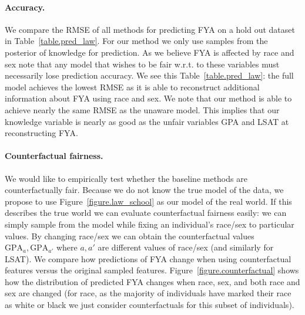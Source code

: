 \paragraph{Accuracy.}
We compare the RMSE of all methods for predicting FYA on a hold out dataset in Table~\ref{table.pred_law}. For our method we only use samples from the posterior of knowledge for prediction. As we believe FYA is affected by race and sex note that any model that wishes to be fair w.r.t. to these variables must necessarily lose prediction accuracy. We see this Table~\ref{table.pred_law}: the full model achieves the lowest RMSE as it is able to reconstruct additional information about FYA using race and sex. We note that our method is able to achieve nearly the same RMSE as the unaware model. This implies that our knowledge variable is nearly as good as the unfair variables GPA and LSAT at reconstructing FYA.


\paragraph{Counterfactual fairness.}
We would like to empirically test whether the baseline methods are counterfactually fair. Because we do not know the true model of the data, we propose to use Figure~\ref{figure.law_school} as our model of the real world. If this describes the true world we can evaluate counterfactual fairness easily: we can simply sample from the model while fixing an individual's race/sex to particular values. By changing race/sex we can obtain the counterfactual values $\mbox{GPA}_a,\mbox{GPA}_{a'}$ where $a,a'$ are different values of race/sex (and similarly for LSAT). We compare how predictions of FYA change when using counterfactual features versus the original sampled features. Figure~\ref{figure.counterfactual} shows how the distribution of predicted FYA changes when race, sex, and both race and sex are changed (for race, as the majority of individuals have marked their race as white or black we just consider counterfactuals for this subset of individuals).


 


